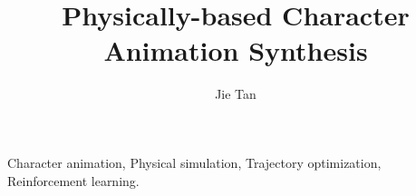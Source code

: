 \documentclass[graybox]{svmult}
\begin{document}
\title*{Physically-based Character Animation Synthesis}
\author{Jie Tan}
%
%
\maketitle

\begin{keywords}
Character animation, Physical simulation, Trajectory optimization, Reinforcement learning.
  \end{keywords}





%


\printindex
\end{document}
